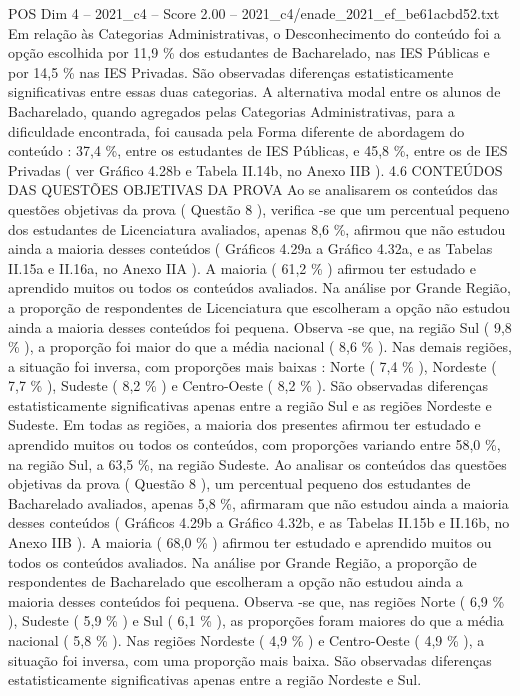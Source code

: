 \begin{textsample}{POS Dim 4 – 2021\_c4 – Score 2.00 – 2021\_c4/enade\_2021\_ef\_be61acbd52.txt}
Em relação às Categorias Administrativas, o Desconhecimento do conteúdo foi a opção escolhida por 11,9 \% dos estudantes de Bacharelado, nas IES Públicas e por 14,5 \% nas IES Privadas.
São observadas diferenças estatisticamente significativas entre essas duas categorias.
A alternativa modal entre os alunos de Bacharelado, quando agregados pelas Categorias Administrativas, para a dificuldade encontrada, foi causada pela Forma diferente de abordagem do conteúdo : 37,4 \%, entre os estudantes de IES Públicas, e 45,8 \%, entre os de IES Privadas ( ver Gráfico 4.28b e Tabela II.14b, no Anexo IIB ). 4.6 CONTEÚDOS DAS QUESTÕES OBJETIVAS DA PROVA Ao se analisarem os conteúdos das questões objetivas da prova ( Questão 8 ), verifica -se que um percentual pequeno dos estudantes de Licenciatura avaliados, apenas 8,6 \%, afirmou que não estudou ainda a maioria desses conteúdos ( Gráficos 4.29a a Gráfico 4.32a, e as Tabelas II.15a e II.16a, no Anexo IIA ).
A maioria ( 61,2 \% ) afirmou ter estudado e aprendido muitos ou todos os conteúdos avaliados.
Na análise por Grande Região, a proporção de respondentes de Licenciatura que escolheram a opção não estudou ainda a maioria desses conteúdos foi pequena.
Observa -se que, na região Sul ( 9,8 \% ), a proporção foi maior do que a média nacional ( 8,6 \% ).
Nas demais regiões, a situação foi inversa, com proporções mais baixas : Norte ( 7,4 \% ), Nordeste ( 7,7 \% ), Sudeste ( 8,2 \% ) e Centro-Oeste ( 8,2 \% ).
São observadas diferenças estatisticamente significativas apenas entre a região Sul e as regiões Nordeste e Sudeste.
Em todas as regiões, a maioria dos presentes afirmou ter estudado e aprendido muitos ou todos os conteúdos, com proporções variando entre 58,0 \%, na região Sul, a 63,5 \%, na região Sudeste.
Ao analisar os conteúdos das questões objetivas da prova ( Questão 8 ), um percentual pequeno dos estudantes de Bacharelado avaliados, apenas 5,8 \%, afirmaram que não estudou ainda a maioria desses conteúdos ( Gráficos 4.29b a Gráfico 4.32b, e as Tabelas II.15b e II.16b, no Anexo IIB ).
A maioria ( 68,0 \% ) afirmou ter estudado e aprendido muitos ou todos os conteúdos avaliados.
Na análise por Grande Região, a proporção de respondentes de Bacharelado que escolheram a opção não estudou ainda a maioria desses conteúdos foi pequena.
Observa -se que, nas regiões Norte ( 6,9 \% ), Sudeste ( 5,9 \% ) e Sul ( 6,1 \% ), as proporções foram maiores do que a média nacional ( 5,8 \% ).
Nas regiões Nordeste ( 4,9 \% ) e Centro-Oeste ( 4,9 \% ), a situação foi inversa, com uma proporção mais baixa.
São observadas diferenças estatisticamente significativas apenas entre a região Nordeste e Sul.

\end{textsample}
